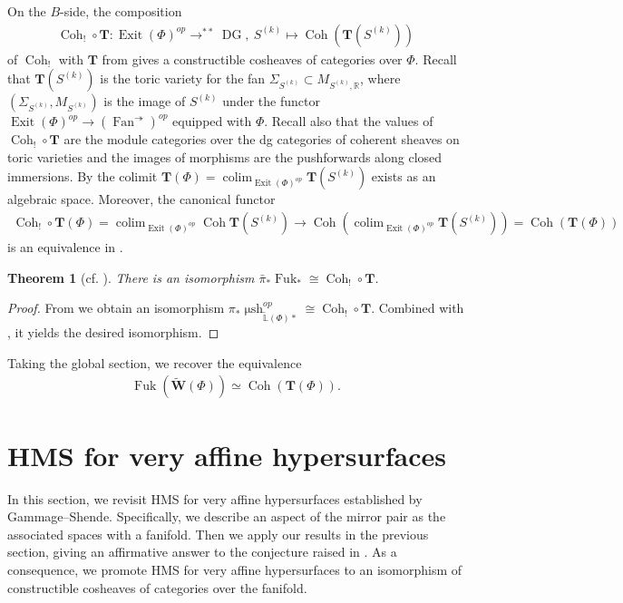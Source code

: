 \documentclass[a4paper,12pt, twoside, pdftex]{amsart}
\newtheorem{theorem}[dummy]{Theorem}
\theoremstyle{definition}
\numberwithin{equation}{section}
\newcommand{\pref}{\prettyref}
\newcommand{\colim}{\operatorname{colim}}
\newcommand{\Coh}{\operatorname{Coh}}
\newcommand{\DG}{\operatorname{DG}}
\newcommand{\Exit}{\operatorname{Exit}}
\newcommand{\Fan}{\operatorname{Fan}}
\newcommand{\Fuk}{\operatorname{Fuk}}
\newcommand{\msh}{\operatorname{\mu sh}}
\newcommand{\bL}{\mathbb{L}}
\newcommand{\bR}{\mathbb{R}}
\newcommand{\bfT}{\mathbf{T}}
\newcommand{\bfW}{\mathbf{W}}
\begin{document}
On the $B$-side,
the composition
\begin{align*}
\Coh_! \circ \bfT
\colon
\Exit(\Phi)^{op}
\to
^{**} \DG, \
S^{(k)}
\mapsto
\Coh(\bfT(S^{(k)}))
\end{align*}
of
$\Coh_!$
with
$\bfT$
from
\cite[Section 3]{GS1}
gives a constructible cosheaves of categories over
$\Phi$.
Recall that
$\bfT(S^{(k)})$
is the toric variety for the fan
$\Sigma_{S^{(k)}} \subset M_{S^{(k)}, \bR}$,
where
$(\Sigma_{S^{(k)}}, M_{S^{(k)}})$
is the image of
$S^{(k)}$
under the functor
$\Exit(\Phi)^{op}
\to
(\Fan^\twoheadrightarrow)^{op}$
equipped with
$\Phi$.
Recall also that
the values of
$\Coh_! \circ \bfT$
are the module categories over the dg categories of coherent sheaves on toric varieties
and
the images of morphisms are the pushforwards along closed immersions.
By
\cite[Proposition 3.10]{GS1} the colimit
$\bfT(\Phi)
=
\colim_{\Exit(\Phi)^{op}} \bfT(S^{(k)})$
exists as an algebraic space.
Moreover,
the canonical functor
\begin{align*}
\Coh_! \circ \bfT(\Phi)
=
\colim_{\Exit(\Phi)^{op}} \Coh \bfT(S^{(k)})
\to
\Coh \left( \colim_{\Exit(\Phi)^{op}} \bfT(S^{(k)}) \right)
=
\Coh(\bfT(\Phi))
\end{align*}
is an equivalence in
\cite[Proposition 3.14]{GS1}.

\begin{theorem}[cf. {\cite[Corollary 5.8]{GS1}}] \label{thm:HMS}
There is an isomorphism
$\bar{\pi}_* \Fuk_*
\cong
\Coh_! \circ \bfT$.
\end{theorem}
\begin{proof}
From
\cite[Theorem 5.3]{GS1}
we obtain an isomorphism
$\pi_* \msh^{op}_{\widetilde{\bL}(\Phi) *}
\cong
\Coh_! \circ \bfT$.
Combined with
\pref{lem:topological},
it yields the desired isomorphism.
\end{proof}

Taking the global section,
we recover the equivalence
\cite[Theorem 5.4]{GS1}
\begin{align} \label{eq:HMS}
\Fuk(\widetilde{\bfW}(\Phi))
\simeq
\Coh(\bfT(\Phi)).
\end{align}

\section{HMS for very affine hypersurfaces}
In this section,
we revisit HMS for very affine hypersurfaces established by Gammage--Shende.
Specifically,
we describe an aspect of the mirror pair as the associated spaces with a fanifold.
Then we apply our results in the previous section,
giving an affirmative answer to the conjecture raised in
\cite[Section 2.5]{GS2}.
As a consequence,
we promote HMS for very affine hypersurfaces to an isomorphism of constructible cosheaves of categories over the fanifold. 
\end{document}
